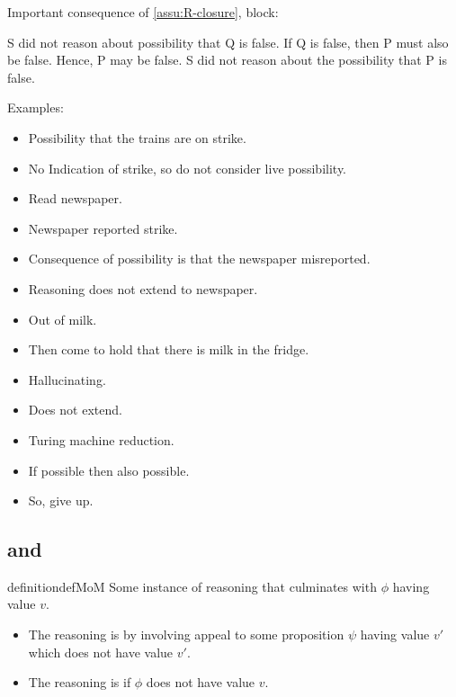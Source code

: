 \begin{note}
  Important consequence of \autoref{assu:R-closure}, block:

  S did not reason about possibility that Q is false.
  If Q is false, then P must also be false.
  Hence, P may be false.
  S did not reason about the possibility that P is false.

  \begin{note}
  Examples:
  \begin{itemize}
  \item Possibility that the trains are on strike.
  \item No Indication of strike, so do not consider live possibility.
  \item Read newspaper.
  \item Newspaper reported strike.
  \item Consequence of possibility is that the newspaper misreported.
  \item Reasoning does not extend to newspaper.
  \end{itemize}

  \begin{itemize}
  \item Out of milk.
  \item Then come to hold that there is milk in the fridge.
  \item Hallucinating.
  \item Does not extend.
  \end{itemize}

  \begin{itemize}
  \item Turing machine reduction.
  \item If possible then also possible.
  \item So, give up.
  \end{itemize}
\end{note}
\end{note}

\subsection{\mistaken{-} and \misled{}}
\label{sec:presence}

\begin{note}
  \begin{restatable}{definition}{defMoM}\label{def:MoM}
    Some instance of reasoning that culminates with \(\phi\) having value \(v\).
    \begin{itemize}
      \item The reasoning is \emph{\mistaken{}} by involving appeal to some proposition \(\psi\) having value \(v'\) which does not have value \(v'\).
    \item The reasoning is \emph{\misled{}} if \(\phi\) does not have value \(v\).
    \end{itemize}
    \vspace{-\baselineskip}
  \end{restatable}
\end{note}

